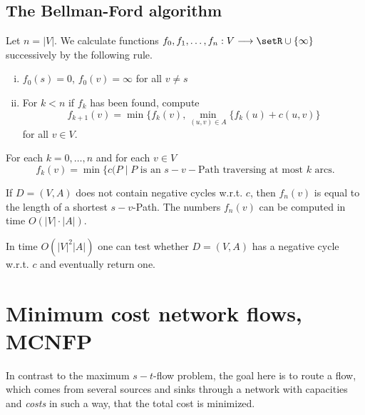 \subsection*{The Bellman-Ford algorithm}

Let $n=|V|$. We calculate functions $f_0,f_1,\ldots,f_n:V\longrightarrow\setR\cup\{\infty\}$
successively by the following rule. 

\begin{enumerate}[i)]
\item $f_0(s) = 0$, $f_0(v) = \infty$ for all $v \neq s$ 
\item For $k<n$ if $f_k$ has been found, compute 
  \begin{displaymath}
    \displaystyle f_{k+1}(v) = \min\{f_k(v), \min_{(u,v)\in A}\{f_k(u)+c(u,v)\}  
  \end{displaymath}
  for all $v \in V$. 
\end{enumerate}

\begin{theorem}
  \label{thr:1}
  For each $k=0,\ldots,n$ and for each $v \in V$ 
  \begin{displaymath}
    f_k(v)  = \min\{ c(P \mid P \text{ is an } s-v-\text{Path traversing
    at most } k \text{ arcs}.
  \end{displaymath}
\end{theorem}

\begin{corollary}
  \label{co:7}
  If $D = (V,A) $ does not contain negative cycles w.r.t. $c$, then
  $f_n(v)$ is equal to the length of a shortest $s-v$-Path. The
  numbers $f_n(v)$ can be computed in time $O( |V| \cdot |A| )$. 
\end{corollary}


\begin{corollary}
  \label{co:9}
  In time $O(|V|^2 |A| )$  one can test whether $D = (V,A)$ has a
  negative cycle w.r.t. $c$ and eventually return one. 
\end{corollary}


\section{Minimum cost network flows, MCNFP}
\label{sec:minimum-cots-flows}

In contrast to the maximum $s-t$-flow problem, the goal here is to
route a flow, which comes from several sources and sinks through a
network with capacities and \emph{costs} in such a way, that the total
cost is minimized. 

